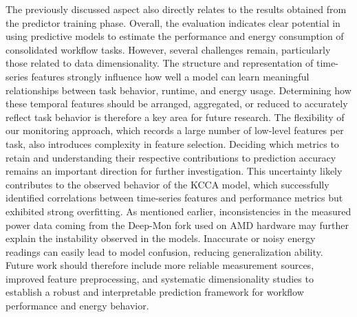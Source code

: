 The previously discussed aspect also directly relates to the results obtained from the predictor training phase. Overall, the evaluation indicates clear potential in using predictive models to estimate the performance and energy consumption of consolidated workflow tasks. However, several challenges remain, particularly those related to data dimensionality. The structure and representation of time-series features strongly influence how well a model can learn meaningful relationships between task behavior, runtime, and energy usage. Determining how these temporal features should be arranged, aggregated, or reduced to accurately reflect task behavior is therefore a key area for future research.
The flexibility of our monitoring approach, which records a large number of low-level features per task, also introduces complexity in feature selection. Deciding which metrics to retain and understanding their respective contributions to prediction accuracy remains an important direction for further investigation. This uncertainty likely contributes to the observed behavior of the KCCA model, which successfully identified correlations between time-series features and performance metrics but exhibited strong overfitting.
As mentioned earlier, inconsistencies in the measured power data coming from the Deep-Mon fork used on AMD hardware may further explain the instability observed in the models. Inaccurate or noisy energy readings can easily lead to model confusion, reducing generalization ability. Future work should therefore include more reliable measurement sources, improved feature preprocessing, and systematic dimensionality studies to establish a robust and interpretable prediction framework for workflow performance and energy behavior.

